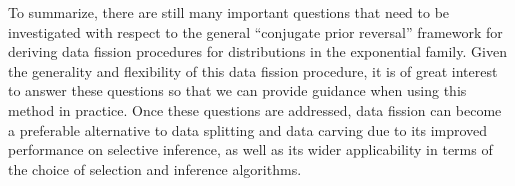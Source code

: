 To summarize, there are still many important questions that need to be investigated with respect to the general ``conjugate prior reversal'' framework for deriving data fission procedures for distributions in the exponential family. Given the generality and flexibility of this data fission procedure, it is of great interest to answer these questions so that we can provide guidance when using this method in practice. Once these questions are addressed, data fission can become a preferable alternative to data splitting and data carving due to its improved performance on selective inference, as well as its wider applicability in terms of the choice of selection and inference algorithms.